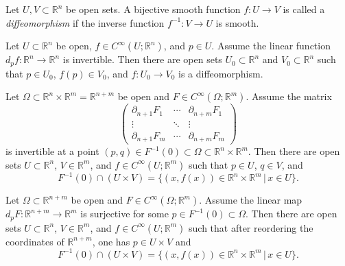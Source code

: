 \documentclass{ximera}
\begin{document}
\begin{definition}[Diffeomorphism]
Let $U , V \subset \mathbb{R}^n$ be open sets. A bijective smooth function $f : U \to V$ is called a \emph{diffeomorphism} if the inverse function $f^{-1} : V \to U$ is smooth.  
\end{definition}


\begin{theorem}\label{thm:inverse-function}
    Let $U \subset \mathbb{R}^n$ be open, $f \in C^{\infty}(U; \mathbb{R}^n)$, and $p \in U$. Assume the linear function $d_p f : \mathbb{R}^n \to \mathbb{R}^n$ is invertible. Then there are open sets $U_0 \subset \mathbb{R}^n$ and $ V_0 \subset \mathbb{R}^n$ such that  $p \in U_0$, $f(p )\in V_0$, and $f : U _ 0 \to V_0$ is a diffeomorphism.
\end{theorem}


\begin{theorem}\label{thm:implicit}
    Let $\Omega \subset \mathbb{R}^n \times \mathbb{R}^m =  \mathbb{R}^{n+m}$ be open and $F \in C^{\infty}(\Omega; \mathbb{R}^m)$. Assume the matrix
    \[   \begin{pmatrix}
        \partial _{n+1} F_1 & \cdots & \partial _{n+m} F_1 \\
        \vdots & \ddots & \vdots \\
        \partial _{n+1} F_m & \cdots & \partial _{n+m } F_m 
    \end{pmatrix}                            \]
    is invertible at a point $(p,q) \in  F^{-1} (0) \subset  \Omega \subset \mathbb{R}^n \times \mathbb{R}^m   $. Then there are  open sets $U \subset \mathbb{R}^n$, $V \in \mathbb{R}^m$, and $f \in C^{\infty}(U; \mathbb{R}^m)$ such that $p \in U$, $q \in V$, and 
    \[     F^{-1} (0)  \cap ( U \times V)  = \{ (x, f(x) ) \in \mathbb{R}^n \times \mathbb{R}^m \, \vert \,  x \in U  \}    .        \]
\end{theorem}


\begin{corollary}
    Let $\Omega \subset    \mathbb{R}^{n+m}$ be open and $F \in C^{\infty}(\Omega; \mathbb{R}^m)$. Assume the linear map $d_{p} F : \mathbb{R}^{n+m} \to \mathbb{R}^m$ is surjective for some  $ p \in  F^{-1} (0) \subset  \Omega  $. Then there are  open sets $U \subset \mathbb{R}^n$, $V \in \mathbb{R}^m$, and $f \in C^{\infty}(U; \mathbb{R}^m)$ such that after reordering the coordinates of $\mathbb{R}^{n+m}$, one has  $p \in U\times V$ and 
    \[     F^{-1} (0)  \cap ( U \times V)  = \{ (x, f(x) ) \in \mathbb{R}^n \times \mathbb{R}^m \, \vert \,  x \in U  \}    .        \]
\end{corollary}
\end{document}
